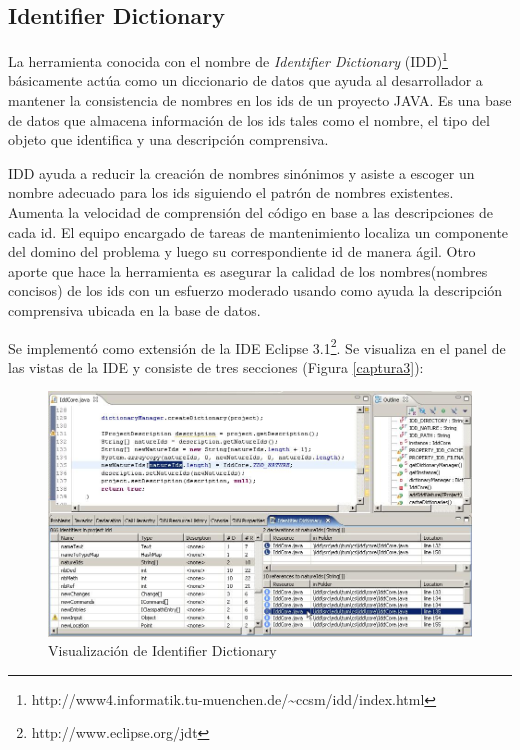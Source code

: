 \documentclass[12pt]{report}
\begin{document}
\subsection{Identifier Dictionary}

La herramienta conocida con el nombre de \textit{Identifier Dictionary} (IDD)\footnote[1]{http://www4.informatik.tu-muenchen.de/\~{}ccsm/idd/index.html} básicamente actúa como un diccionario de datos que ayuda al desarrollador a mantener la consistencia de nombres en los ids de un proyecto JAVA. Es una base de datos que almacena información de los ids tales como el nombre, el tipo del objeto que identifica y una descripción comprensiva.

IDD ayuda a reducir la creación de nombres sinónimos y asiste a escoger un nombre adecuado para los ids siguiendo el patrón de nombres existentes. Aumenta la velocidad de comprensión del código en base a las descripciones de cada id. El equipo encargado de tareas de mantenimiento localiza un componente del domino del problema y luego su correspondiente id de manera ágil. Otro aporte que hace la herramienta es asegurar la calidad de los nombres(nombres concisos) de los ids con un esfuerzo moderado usando como ayuda la descripción comprensiva ubicada en la base de datos\cite{DFPM05,LFBEX07}.

Se implementó como extensión de la IDE Eclipse 3.1\footnote[2]{http://www.eclipse.org/jdt}. Se visualiza en el panel de las vistas de la IDE y consiste de tres secciones (Figura \ref{captura3}):

\begin{figure}[t] %
\centering
\includegraphics[scale= 0.40]{./idd_3.png}
\caption{Visualización de Identifier Dictionary}
\label{captura4}
\end{figure} 
\end{document}

